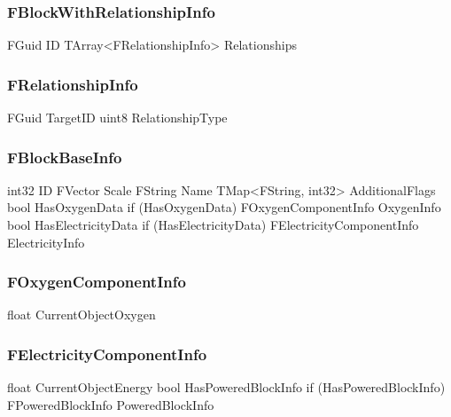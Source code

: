 \newpage


\subsubsection{FBlockWithRelationshipInfo}
\begin{code}
FGuid                                       ID
TArray<FRelationshipInfo>                   Relationships
\end{code}

\subsubsection{FRelationshipInfo}
\begin{code}
FGuid                                       TargetID
uint8                                       RelationshipType
\end{code}


\subsubsection{FBlockBaseInfo}
\begin{code}
int32                                       ID
FVector                                     Scale
FString                                     Name
TMap<FString, int32>                        AdditionalFlags
bool                                        HasOxygenData
if (HasOxygenData)
    FOxygenComponentInfo                    OxygenInfo
bool                                        HasElectricityData
if (HasElectricityData)
    FElectricityComponentInfo               ElectricityInfo
\end{code}





\subsubsection{FOxygenComponentInfo}
\begin{code}
float                                       CurrentObjectOxygen
\end{code}


\subsubsection{FElectricityComponentInfo}
\begin{code}
float                                       CurrentObjectEnergy
bool                                        HasPoweredBlockInfo
if (HasPoweredBlockInfo)
    FPoweredBlockInfo                       PoweredBlockInfo
\end{code}

